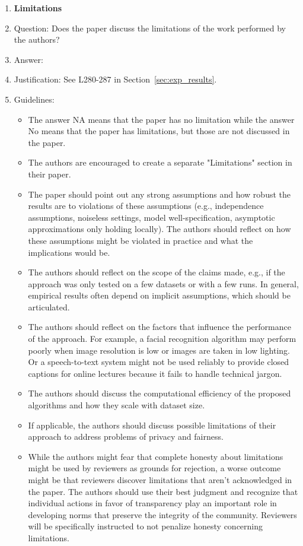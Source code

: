 \documentclass{article}
\begin{document}
\begin{enumerate}
\item {\bf Limitations}
    \item[] Question: Does the paper discuss the limitations of the work performed by the authors?
    \item[] Answer: \answerYes{} %
    \item[] Justification: See L280-287 in Section~\ref{sec:exp_results}.
    \item[] Guidelines:
    \begin{itemize}
        \item The answer NA means that the paper has no limitation while the answer No means that the paper has limitations, but those are not discussed in the paper. 
        \item The authors are encouraged to create a separate "Limitations" section in their paper.
        \item The paper should point out any strong assumptions and how robust the results are to violations of these assumptions (e.g., independence assumptions, noiseless settings, model well-specification, asymptotic approximations only holding locally). The authors should reflect on how these assumptions might be violated in practice and what the implications would be.
        \item The authors should reflect on the scope of the claims made, e.g., if the approach was only tested on a few datasets or with a few runs. In general, empirical results often depend on implicit assumptions, which should be articulated.
        \item The authors should reflect on the factors that influence the performance of the approach. For example, a facial recognition algorithm may perform poorly when image resolution is low or images are taken in low lighting. Or a speech-to-text system might not be used reliably to provide closed captions for online lectures because it fails to handle technical jargon.
        \item The authors should discuss the computational efficiency of the proposed algorithms and how they scale with dataset size.
        \item If applicable, the authors should discuss possible limitations of their approach to address problems of privacy and fairness.
        \item While the authors might fear that complete honesty about limitations might be used by reviewers as grounds for rejection, a worse outcome might be that reviewers discover limitations that aren't acknowledged in the paper. The authors should use their best judgment and recognize that individual actions in favor of transparency play an important role in developing norms that preserve the integrity of the community. Reviewers will be specifically instructed to not penalize honesty concerning limitations.
    \end{itemize}


\end{enumerate}
\end{document}
